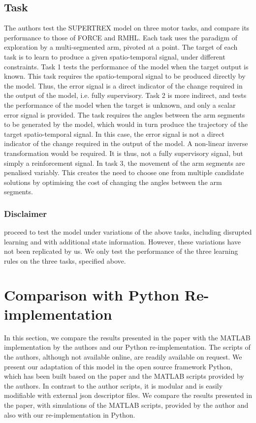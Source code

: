 \subsection{Task}

The authors test the SUPERTREX model on three motor tasks, and compare its performance to those of FORCE and RMHL. Each task uses the paradigm of exploration by a multi-segmented arm, pivoted at a point. The target of each task is to learn to produce a given spatio-temporal signal, under different constraints. Task 1 tests the performance of the model when the target output is known. This task requires the spatio-temporal signal to be produced directly by the model. Thus, the error signal is a direct indicator of the change required in the output of the model, i.e. fully supervisory. Task 2 is more indirect, and tests the performance of the model when the target is unknown, and only a scalar error signal is provided. The task requires the angles between the arm segments to be generated by the model, which would in turn produce the trajectory of the target spatio-temporal signal. In this case, the error signal is not a direct indicator of the change required in the output of the model. A non-linear inverse transformation would be required. It is thus, not a fully supervisory signal, but simply a reinforcement signal. In task 3, the movement of the arm segments are penalised variably. This creates the need to choose one from multiple candidate solutions by optimising the cost of changing the angles between the arm segments.


\subsubsection{Disclaimer}
\textcite{pyle2019} proceed to test the model under variations of the above tasks, including disrupted learning and with additional state information. However, these variations have not been replicated by us. We only test the performance of the three learning rules on the three tasks, specified above.


\section{Comparison with Python Re-implementation}

In this section, we compare the results presented in the paper \cite{pyle2019} with the MATLAB implementation by the authors and our Python re-implementation. The scripts of the authors, although not available online, are readily available on request. We present our adaptation of this model in the open source framework Python, which has been built based on the paper and the MATLAB scripts provided by the authors. In contrast to the author scripts, it is modular and is easily modifiable with external json descriptor files. We compare the results presented in the paper, with simulations of the MATLAB scripts, provided by the author and also with our re-implementation in Python.\\ 

